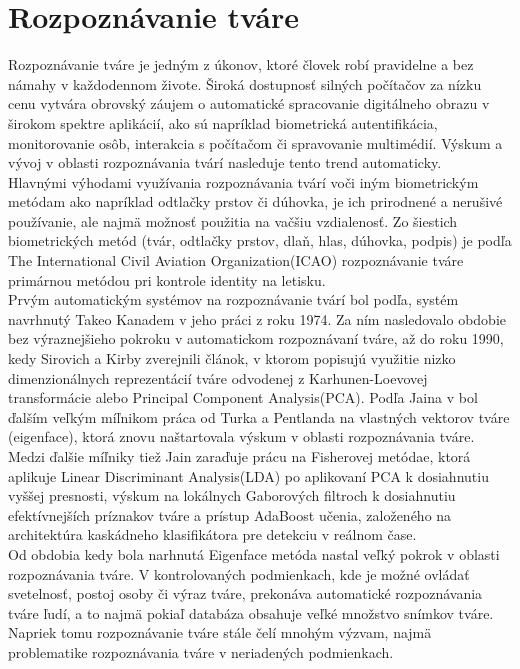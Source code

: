 \section{Rozpoznávanie tváre}
Rozpoznávanie tváre je jedným z úkonov, ktoré človek robí pravidelne a bez námahy v každodennom živote.
Široká dostupnosť silných počítačov za nízku cenu vytvára obrovský záujem o automatické spracovanie digitálneho
obrazu v širokom spektre aplikácií, ako sú napríklad biometrická autentifikácia, monitorovanie osôb,
interakcia s počítačom či spravovanie multimédií.
Výskum a vývoj v oblasti rozpoznávania tvárí nasleduje tento trend
automaticky.\\
\indent Hlavnými výhodami využívania rozpoznávania tvárí voči iným biometrickým metódam ako napríklad odtlačky prstov či dúhovka,
je ich prirodnené a nerušivé používanie, ale najmä možnosť použitia na vačšiu vzdialenosť. Zo šiestich biometrických metód (tvár, odtlačky prstov, dlaň, hlas, dúhovka, podpis)
je podľa The International Civil Aviation Organization(ICAO)\cite{icao} rozpoznávanie tváre primárnou metódou pri kontrole identity na letisku.\\
\indent Prvým automatickým systémov na rozpoznávanie tvárí bol podľa\cite{handbookface}, systém navrhnutý Takeo Kanadem v jeho práci\cite{kanade1974} z roku 1974.
Za ním nasledovalo obdobie bez výraznejšieho pokroku v automatickom rozpoznávaní tváre, až do roku 1990, kedy Sirovich a Kirby zverejnili článok\cite{kirby1990application},
v ktorom popisujú využitie nizko dimenzionálnych reprezentácií tváre odvodenej z Karhunen-Loevovej transformácie alebo Principal Component Analysis(PCA).
Podľa Jaina v\cite{handbookface} bol ďalším veľkým míľnikom práca\cite{turk1991eigenfaces} od Turka a Pentlanda na vlastných vektorov tváre (eigenface),
ktorá znovu naštartovala výskum v oblasti rozpoznávania tváre. Medzi ďalšie míľniky tiež Jain zaraďuje prácu na Fisherovej metódae\cite{belhumeur1997eigenfaces},
ktorá aplikuje Linear Discriminant Analysis(LDA) po aplikovaní PCA k dosiahnutiu vyššej presnosti, výskum na lokálnych Gaborových filtroch\cite{wiskott1997face}
k dosiahnutiu efektívnejších príznakov tváre a prístup AdaBoost učenia, založeného na architektúra kaskádneho klasifikátora pre detekciu v reálnom čase\cite{viola2001rapid}.\\
\indent Od obdobia kedy bola narhnutá Eigenface metóda nastal veľký pokrok v oblasti rozpoznávania tváre.
V kontrolovaných podmienkach, kde je možné ovládať svetelnosť,
postoj osoby či výraz tváre, prekonáva automatické rozpoznávania tváre ľudí, a to najmä pokiaľ databáza obsahuje veľké množstvo snímkov tváre.
Napriek tomu rozpoznávanie tváre
stále čelí mnohým výzvam, najmä problematike rozpoznávania tváre v neriadených podmienkach.

